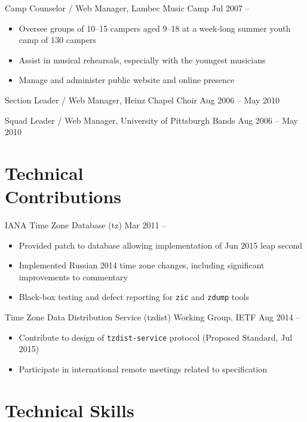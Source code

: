 \documentclass[11pt]{article}
\newcommand{\present}{\phantom{Xxx 20XX}}
\begin{document}
\selectfont
Camp Counselor / Web Manager, Lambec Music Camp
	\hfill Jul 2007 -- \present
\normalfont
\begin{itemize}
	\item Oversee groups of 10--15 campers aged 9--18 at a week-long summer youth camp of 130 campers
	\item Assist in musical rehearsals, especially with the youngest musicians
	\item Manage and administer public website and online presence
\end{itemize}

\selectfont
Section Leader / Web Manager, Heinz Chapel Choir
	\hfill Aug 2006 -- May 2010
\normalfont

\selectfont
Squad Leader / Web Manager, University of Pittsburgh Bands
	\hfill Aug 2006 -- May 2010
\normalfont



\section{Technical \\ Contributions}

\selectfont
IANA Time Zone Database (tz)
	\hfill Mar 2011 -- \present
\normalfont
\begin{itemize}
	\item Provided patch to database allowing implementation of Jun 2015 leap second
	\item Implemented Russian 2014 time zone changes,
		including significant improvements to commentary
	\item Black-box testing and defect reporting for \texttt{zic} and \texttt{zdump} tools
\end{itemize}

\selectfont
Time Zone Data Distribution Service (tzdist) Working Group, IETF
	\hfill Aug 2014 -- \present
\normalfont
\begin{itemize}
	\item Contribute to design of \texttt{tzdist-service} protocol (Proposed Standard, Jul 2015)
	\item Participate in international remote meetings related to specification
\end{itemize}



\section{Technical Skills}
\end{document}
